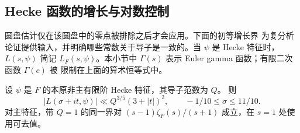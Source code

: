 \subsection{Hecke 函数的增长与对数控制}

圆盘估计仅在该圆盘中的零点被排除之后才会应用。下面的初等增长界
为复分析论证提供输入，并明确哪些常数关于导子是一致的。当 $\psi$
是 Hecke 特征时，$L(s,\psi)$ 简记 $L_F(s,\psi)$。本小节中
$\Gamma(s)$ 表示 Euler gamma 函数；有限二次函数 $\Gamma(c)$ 被
限制在上面的算术恒等式中。

\begin{lemma}\label{lem:hecke-strip-growth}
设 $\psi$ 是 $F$ 的本原非主有限阶 Hecke 特征，其导子范数为 $Q$。
则
\begin{equation}\label{eq:hecke-growth}
 |L(\sigma+it,\psi)|\ll Q^{3/5}(3+|t|)^2,
 \qquad-1/10\le\sigma\le11/10.
\end{equation}
对主特征，带 $Q=1$ 的同一界对 $(s-1)\zeta_F(s)/(s+1)$ 成立，在
$s=1$ 处使用可去值。
\end{lemma}

